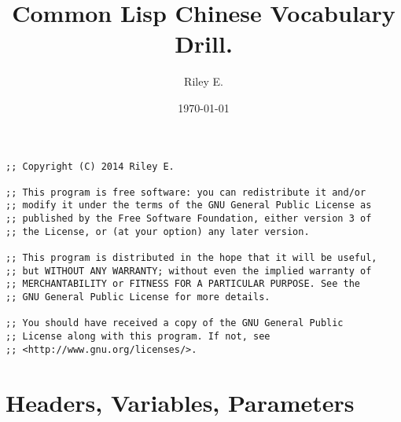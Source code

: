 \documentclass[11pt]{article}
\author{Riley E.}
\date{\today}
\title{Common Lisp Chinese Vocabulary Drill.}
\begin{document}
\maketitle
\setcounter{tocdepth}{2}
\tableofcontents

\begin{verbatim}
;; Copyright (C) 2014 Riley E.

;; This program is free software: you can redistribute it and/or
;; modify it under the terms of the GNU General Public License as
;; published by the Free Software Foundation, either version 3 of
;; the License, or (at your option) any later version.

;; This program is distributed in the hope that it will be useful,
;; but WITHOUT ANY WARRANTY; without even the implied warranty of
;; MERCHANTABILITY or FITNESS FOR A PARTICULAR PURPOSE. See the
;; GNU General Public License for more details.

;; You should have received a copy of the GNU General Public
;; License along with this program. If not, see
;; <http://www.gnu.org/licenses/>.
\end{verbatim}

\section{Headers, Variables, Parameters}
\label{sec-1}
\end{document}
